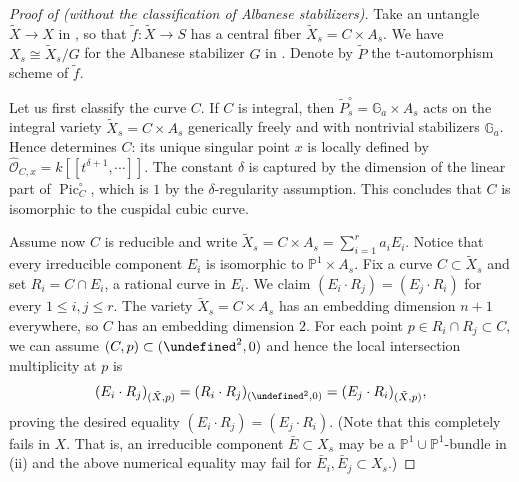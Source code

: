 \documentclass[reqno, letterpaper]{amsart}
\numberwithin{equation}{subsection}
\let\AA\undefined
\let\to\longrightarrow
\newcommand{\AA}{\mathbb{A}}
\newcommand{\GG}{\mathbb{G}}
\newcommand{\PP}{\mathbb{P}}
\DeclareMathOperator{\Pic}{Pic}
\begin{document}
		\begin{proof}[Proof of  (without the classification of Albanese stabilizers)]
			Take an untangle $\tilde X \to X$ in , so that $\tilde f : \tilde X \to S$ has a central fiber $\tilde X_s = C \times A_s$. We have $X_s \cong \tilde X_s / G$ for the Albanese stabilizer $G$ in . Denote by $\tilde P$ the t-automorphism scheme of $\tilde f$.
			
			\medskip
			
			Let us first classify the curve $C$. If $C$ is integral, then $\tilde P^\circ_s = \GG_a \times A_s$ acts on the integral variety $\tilde X_s = C \times A_s$ generically freely and with nontrivial stabilizers $\GG_a$. Hence  determines $C$: its unique singular point $x$ is locally defined by $\hat {\mathcal O}_{C, x} = k[[t^{\delta+1}, \cdots]]$. The constant $\delta$ is captured by the dimension of the linear part of $\Pic^\circ_C$, which is $1$ by the $\delta$-regularity assumption. This concludes that $C$ is isomorphic to the cuspidal cubic curve.
			
			Assume now $C$ is reducible and write $\tilde X_s = C \times A_s = \sum_{i=1}^r a_i E_i$. Notice that every irreducible component $E_i$ is isomorphic to $\PP^1 \times A_s$. Fix a curve $C \subset \tilde X_s$ and set $R_i = C \cap E_i$, a rational curve in $E_i$. We claim $(E_i \cdot R_j) = (E_j \cdot R_i)$ for every $1 \le i, j \le r$. The variety $\tilde X_s = C \times A_s$ has an embedding dimension $n+1$ everywhere, so $C$ has an embedding dimension $2$. For each point $p \in R_i \cap R_j \subset C$, we can assume $(C, p) \subset (\AA^2, 0)$ and hence the local intersection multiplicity at $p$ is
			\[ (E_i \cdot R_j)_{(\tilde X, p)} = (R_i \cdot R_j)_{(\AA^2,0)} = (E_j \cdot R_i)_{(\tilde X, p)} ,\]
			proving the desired equality $(E_i \cdot R_j) = (E_j \cdot R_i)$. (Note that this completely fails in $X$. That is, an irreducible component $\bar E \subset X_s$ may be a $\PP^1 \cup \PP^1$-bundle in (ii) and the above numerical equality may fail for $\bar E_i, \bar E_j \subset X_s$.)
			

\end{proof}
\end{document}
